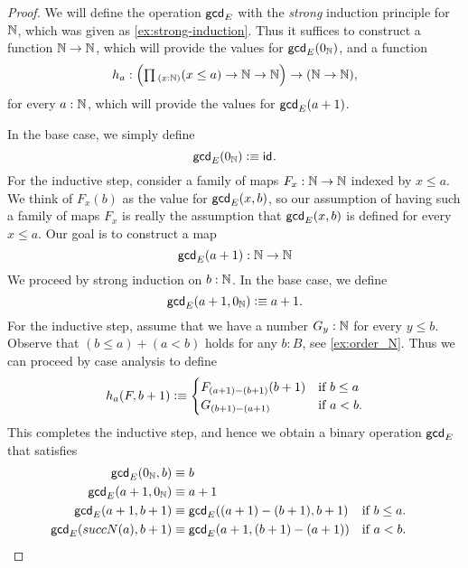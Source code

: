 \begin{proof}
  We will define the operation $\mathsf{gcd}_E$ with the \emph{strong} induction principle for ${\mathbb{N}}$, which was given as \cref{ex:strong-induction}. Thus it suffices to construct a function ${\mathbb{N}}\to{\mathbb{N}}$, which will provide the values for $\mathsf{gcd}_E(0_{{\mathbb{N}}})$, and a function
  \begin{equation*}
    h_a:\Big(\prd{x:\N}(x\leq a) \to \N\to\N\Big)\to (\N\to\N),
  \end{equation*}
  for every $a:{\mathbb{N}}$, which will provide the values for $\mathsf{gcd}_E(a+1)$.

  In the base case, we simply define
  \begin{equation*}
    \mathsf{gcd}_E(0_{{\mathbb{N}}})\vcentcolon\equiv\mathsf{id}_{}.
  \end{equation*}
  For the inductive step, consider a family of maps $F_x:{\mathbb{N}}\to{\mathbb{N}}$ indexed by $x\leq a$. We think of $F_x(b)$ as the value for $\mathsf{gcd}_E(x,b)$, so our assumption of having such a family of maps $F_x$ is really the assumption that $\mathsf{gcd}_E(x,b)$ is defined for every $x\leq a$. Our goal is to construct a map
  \begin{equation*}
    \mathsf{gcd}_E(a+1):{\mathbb{N}}\to{\mathbb{N}}
  \end{equation*}
  We proceed by strong induction on $b:{\mathbb{N}}$. In the base case, we define
  \begin{equation*}
    \mathsf{gcd}_E(a+1,0_{{\mathbb{N}}})\vcentcolon\equiv a+1.
  \end{equation*}
  For the inductive step, assume that we have a number $G_y:{\mathbb{N}}$ for every $y\leq b$. Observe that $(b\leq a)+(a<b)$ holds for any $b:B$, see \cref{ex:order_N}. Thus we can proceed by case analysis to define
  \begin{equation*}
    h_a(F,b+1)\vcentcolon\equiv
    \begin{cases}
      F_{(a+1)-(b+1)}(b+1) & \text{if }b\leq a\\
      G_{(b+1)-(a+1)} & \text{if }a<b.
    \end{cases}
  \end{equation*}
  This completes the inductive step, and hence we obtain a binary operation
  $\mathsf{gcd}_E$ that satisfies
  \begin{align*}
    \mathsf{gcd}_E(0_{{\mathbb{N}}},b) & \equiv b \\
    \mathsf{gcd}_E(a+1,0_{{\mathbb{N}}}) & \equiv a+1 \\
    \mathsf{gcd}_E(a+1,b+1) & \equiv \mathsf{gcd}_E((a+1)-(b+1),b+1) & & \text{if }b\leq a.\\
    \mathsf{gcd}_E(succN(a),b+1) & \equiv \mathsf{gcd}_E(a+1,(b+1)-(a+1)) & & \text{if }a<b.\qedhere            
  \end{align*}
\end{proof}

